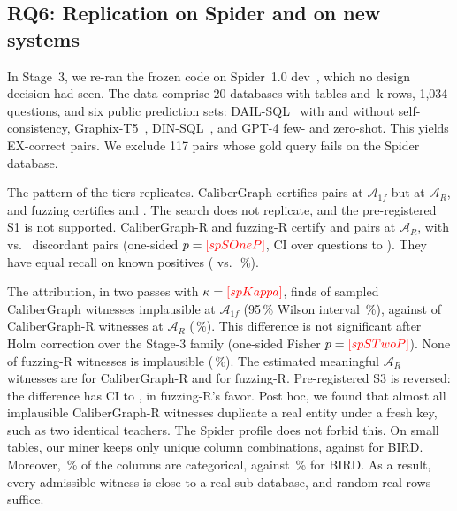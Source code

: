 \subsection{RQ6: Replication on Spider and on new systems}\label{sec:replication}
In Stage~3, we re-ran the frozen code on Spider~1.0 dev~\cite{yu2018spider}, which no design decision had seen. The data comprise 20 databases with  tables and \,k rows, 1,034 questions, and six public prediction sets: DAIL-SQL~\cite{gao2024dailsql} with and without self-consistency, Graphix-T5~\cite{li2023graphix}, DIN-SQL~\cite{pourreza2023dinsql}, and GPT-4 few- and zero-shot. This yields  EX-correct pairs. We exclude 117 pairs whose gold query fails on the Spider database.

The pattern of the tiers replicates. CaliberGraph certifies  pairs at $\mathcal A_{1f}$ but  at $\mathcal A_R$, and fuzzing certifies  and . The search does not replicate, and the pre-registered S1 is not supported. CaliberGraph-R and fuzzing-R certify  and  pairs at $\mathcal A_R$, with  vs.\  discordant pairs (one-sided $p=\V{spSOneP}$, CI over questions  to ). They have equal recall on known positives ( vs.\ \,\%).

The attribution, in two passes with $\kappa=\V{spKappa}$, finds  of  sampled CaliberGraph witnesses implausible at $\mathcal A_{1f}$ (95\,\% Wilson interval \,\%), against  of  CaliberGraph-R witnesses at $\mathcal A_R$ (\,\%). This difference is not significant after Holm correction over the Stage-3 family (one-sided Fisher $p=\V{spSTwoP}$). None of  fuzzing-R witnesses is implausible (\,\%). The estimated meaningful $\mathcal A_R$ witnesses are  for CaliberGraph-R and  for fuzzing-R. Pre-registered S3 is reversed: the difference has CI  to , in fuzzing-R's favor. Post hoc, we found that almost all implausible CaliberGraph-R witnesses duplicate a real entity under a fresh key, such as two identical teachers. The Spider profile does not forbid this. On small tables, our miner keeps only  unique column combinations, against  for BIRD. Moreover, \,\% of the columns are categorical, against \,\% for BIRD. As a result, every admissible witness is close to a real sub-database, and random real rows suffice.

